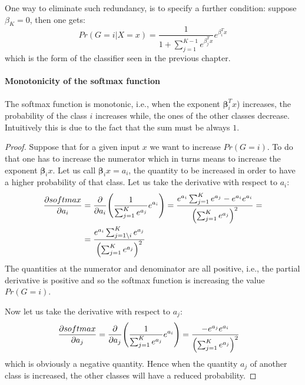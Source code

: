 \documentclass[12pt, letterpaper]{article}
\theoremstyle{definition}
\newcommand{\be}{\mathbf{\beta}}
\DeclarePairedDelimiter\autobracket{(}{)}
\newcommand{\br}[1]{\autobracket*{#1}}
\newcommand{\pr}{\mathrm{\partial}}
\let\tb\textbf
\begin{document}
One way to eliminate such redundancy, is to specify a further condition: suppose $\beta_K = 0$, then one gets:
\begin{equation}
Pr\left(G=i|X=x\right) = \frac{1}{1+\sum_{j=1}^{K-1} e^{\beta_j ^T x}}e^{\beta_i ^T x }
\end{equation}
which is the form of the classifier seen in the previous chapter.

\paragraph{\tb{Monotonicity of the softmax function}} The softmax function is monotonic, i.e., when the exponent $\be_i^T x$) increases, the probability of the class $i$ increases while, the ones of the other classes decrease. Intuitively this is due to the fact that the sum must be always $1$.
\begin{proof}
Suppose that for a given input $x$ we want to increase $Pr(G=i)$. To do that one has to increase the numerator which in turns means to increase the exponent $\be_i x$. Let us call $\be_i x = a_i$, the quantity to be increased in order to have a higher probability of that class. Let us take the derivative with respect to $a_i$:
\begin{equation}
\begin{aligned}
\frac{\partial softmax}{\pr a_i} &=\frac{\partial }{\pr a_i}  \br{\frac{1}{\sum_{j=1}^Ke^{a_j}}e^{a_i} } =\frac{e^{a_i} \sum_{j=1}^Ke^{a_j} - e^{a_i} e^{a_i} } {\br{\sum_{j=1}^Ke^{a_j}}^2} = \\
&=\frac{e^{a_i} \sum_{j=1\setminus i}^Ke^{a_j} }{\br{\sum_{j=1}^Ke^{a_j}}^2} \\
\end{aligned}
\end{equation}
The quantities at the numerator and denominator are all positive, i.e., the partial derivative is positive and so the softmax function is increasing the value $Pr(G=i)$.

Now let us take the derivative with respect to $a_j$:
\begin{equation}
\begin{aligned}
\frac{\partial softmax}{\pr a_j} &=\frac{\partial }{\pr a_j}  \br{\frac{1}{\sum_{j=1}^Ke^{a_j}}e^{a_i} }=\frac{-e^{a_j} e^{a_i} } {\br{\sum_{j=1}^Ke^{a_j}}^2}
\end{aligned}
\end{equation}
which is obviously a negative quantity. Hence when the quantity $a_j$ of another class is increased, the other classes will have a reduced probability.
\end{proof}
\end{document}
